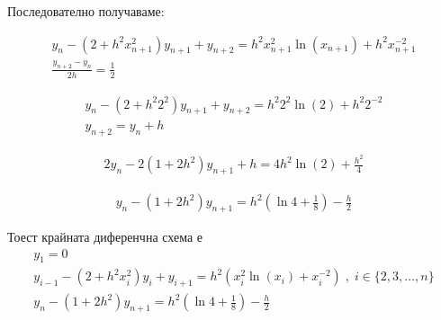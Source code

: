\documentclass[12pt]{article}
\begin{document}
Последователно получаваме:

\begin{align*}
y_{n} -(2 + h^2x_{n + 1}^2)y_{n + 1} + y_{n + 2} = h^2x_{n + 1}^2\ln(x_{n + 1}) + h^2x_{n + 1}^{-2} \\
\displaystyle\frac{y_{n + 2} - y_{n}}{2h} = \frac{1}{2}
\end{align*}

\begin{align*}
y_{n} -(2 + h^2 2^2)y_{n + 1} + y_{n + 2} = h^2 2^2\ln(2) + h^2 2^{-2} \\
y_{n + 2} = y_{n} + h
\end{align*}

\begin{align*}
2y_n -2(1 + 2h^2)y_{n + 1} + h = 4h^2\ln(2) + \frac{h^2}{4}
\end{align*}

\begin{align*}
y_n -(1 + 2h^2)y_{n + 1} = h^2\left(\ln4 + \frac{1}{8}\right) -\frac{h}{2}
\end{align*}

Тоест крайната диференчна схема е
\begin{align*}
y_1 = 0 \\
y_{i - 1} -(2 + h^2x_i^2)y_i + y_{i + 1} = h^2\left(x_i^2\ln(x_i) + x_i^{-2}\right) \; , \; i \in \{2, 3, \dots, n\} \\
y_n -(1 + 2h^2)y_{n + 1} = h^2\left(\ln4 + \frac{1}{8}\right) -\frac{h}{2}
\end{align*}  
\end{document}

